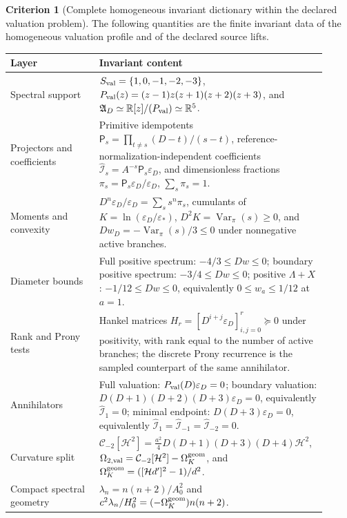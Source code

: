 \documentclass[11pt,a4paper]{article}
\def\Dil{D}%
\numberwithin{equation}{section}
\theoremstyle{definition}
\newtheorem{criterion}{Criterion}
\theoremstyle{plain}
\theoremstyle{remark}
\newcommand{\Dil}{\mathscr{D}}
\newcommand{\epsD}{\varepsilon_D}
\begin{document}
\begin{criterion}[Complete homogeneous invariant dictionary within the declared valuation problem]
The following quantities are the finite invariant data of the homogeneous
valuation profile and of the declared source lifts.
\begin{center}
\small
\begin{tabular}{p{0.27\linewidth}p{0.64\linewidth}}
\toprule
Layer & Invariant content \\
\midrule
Spectral support &
\(S_{\rm val}=\{1,0,-1,-2,-3\}\),
\(P_{\rm val}(z)=(z-1)z(z+1)(z+2)(z+3)\), and
\(\mathfrak A_{\Dil}\simeq\mathbb R[z]/(P_{\rm val})\simeq\mathbb R^5\). \\
Projectors and coefficients &
Primitive idempotents
\(\mathsf P_s=\prod_{t\neq s}(\Dil-t)/(s-t)\),
reference-normalization-independent coefficients
\(\widehat{\mathcal I}_s=A^{-s}\mathsf P_s\epsD\), and dimensionless fractions
\(\pi_s=\mathsf P_s\epsD/\epsD\), \(\sum_s\pi_s=1\). \\
Moments and convexity &
\(\Dil^n\epsD/\epsD=\sum_s s^n\pi_s\), cumulants of
\(K=\ln(\epsD/\varepsilon_*)\),
\(\Dil^2K=\operatorname{Var}_\pi(s)\ge0\), and
\(\Dil w_D=-\operatorname{Var}_\pi(s)/3\le0\) under nonnegative active branches. \\
Diameter bounds &
Full positive spectrum:
\(-4/3\le\Dil w\le0\); boundary positive spectrum:
\(-3/4\le\Dil w\le0\); positive \(\Lambda+X\):
\(-1/12\le\Dil w\le0\), equivalently \(0\le w_a\le1/12\) at \(a=1\). \\
Rank and Prony tests &
Hankel matrices
\(H_r=[\Dil^{i+j}\epsD]_{i,j=0}^r\succeq0\) under positivity, with rank equal to the number of active branches; the discrete Prony recurrence is the sampled counterpart of the same annihilator. \\
Annihilators &
Full valuation:
\(P_{\rm val}(\Dil)\epsD=0\); boundary valuation:
\(\Dil(\Dil+1)(\Dil+2)(\Dil+3)\epsD=0\), equivalently
\(\widehat{\mathcal I}_1=0\); minimal endpoint:
\(\Dil(\Dil+3)\epsD=0\), equivalently
\(\widehat{\mathcal I}_1=\widehat{\mathcal I}_{-1}=\widehat{\mathcal I}_{-2}=0\). \\
Curvature split &
\(\mathcal C_{-2}[\mathcal H^2]
=\frac{a^2}{4}\Dil(\Dil+1)(\Dil+3)(\Dil+4)\mathcal H^2\),
\(\Omega_{2,\rm val}=\mathcal C_{-2}[\mathcal H^2]-\Omega_K^{\rm geom}\), and
\(\Omega_K^{\rm geom}=([\mathcal H d']^2-1)/d^2\). \\
Compact spectral geometry &
\(\lambda_n=n(n+2)/A_0^2\) and
\(c^2\lambda_n/H_0^2=(-\Omega_K^{\rm geom})n(n+2)\). \\

\end{tabular}
\end{center}
\end{criterion}
\end{document}
